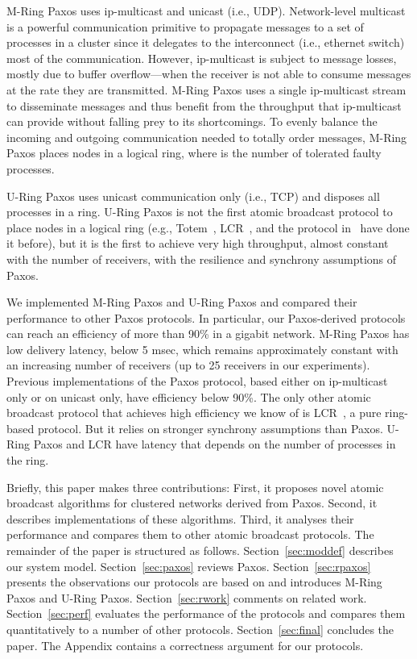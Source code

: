 \documentclass[final,3p,times,twocolumn,authoryear]{elsarticle}
\begin{document}
M-Ring Paxos uses ip-multicast and unicast (i.e., UDP). Network-level multicast is a powerful communication primitive to propagate messages to a set of processes in a cluster since it delegates to the interconnect (i.e., ethernet switch) most of the communication. 
However, ip-multicast is subject to message losses, mostly due to buffer overflow---when the receiver is not able to consume messages at the rate they are transmitted. 
M-Ring Paxos uses a single ip-multicast stream to disseminate messages and thus benefit from the throughput that ip-multicast can provide without falling prey to its shortcomings. To evenly balance the incoming and outgoing communication needed to totally order messages, M-Ring Paxos places  nodes in a logical ring, where  is the number of tolerated faulty processes.

U-Ring Paxos uses unicast communication only (i.e., TCP) and disposes all processes in a ring. U-Ring Paxos is not the first atomic broadcast protocol to place nodes in a logical ring (e.g., Totem~\cite{amir1995totem}, LCR~\cite{Guerraoui2010}, and the protocol in~\cite{ESU04} have done it before), but it is the first to achieve very high throughput, almost constant with the number of receivers, with the resilience and synchrony assumptions of Paxos.

We implemented M-Ring Paxos and U-Ring Paxos and compared their performance to other Paxos protocols. 
In particular, our Paxos-derived protocols can reach an efficiency of more than 90\% in a gigabit network. 
M-Ring Paxos has low delivery latency, below 5 msec, which remains approximately constant with an increasing number of receivers (up to 25 receivers in our experiments).
Previous implementations of the Paxos protocol, based either on ip-multicast only or on unicast only, have efficiency below 90\%. 
The only other atomic broadcast protocol that achieves high efficiency we know of is LCR~\cite{Guerraoui2010}, a pure ring-based protocol. 
But it relies on stronger synchrony assumptions than Paxos. 
U-Ring Paxos and LCR have latency that depends on the number of processes in the ring.

Briefly, this paper makes three contributions: 
First, it proposes novel atomic broadcast algorithms for clustered networks derived from Paxos. 
Second, it describes implementations of these algorithms. 
Third, it analyses their performance and compares them to other atomic broadcast protocols.
The remainder of the paper is structured as follows.
Section~\ref{sec:moddef} describes our system model.
Section~\ref{sec:paxos} reviews Paxos.
Section~\ref{sec:rpaxos} presents the observations our protocols are based on and introduces
M-Ring Paxos and U-Ring Paxos.
Section~\ref{sec:rwork} comments on related work.
Section~\ref{sec:perf} evaluates the performance of the protocols and
compares them quantitatively to a number of other protocols.
Section~\ref{sec:final} concludes the paper.
The Appendix contains a correctness argument for our protocols.
\end{document}

